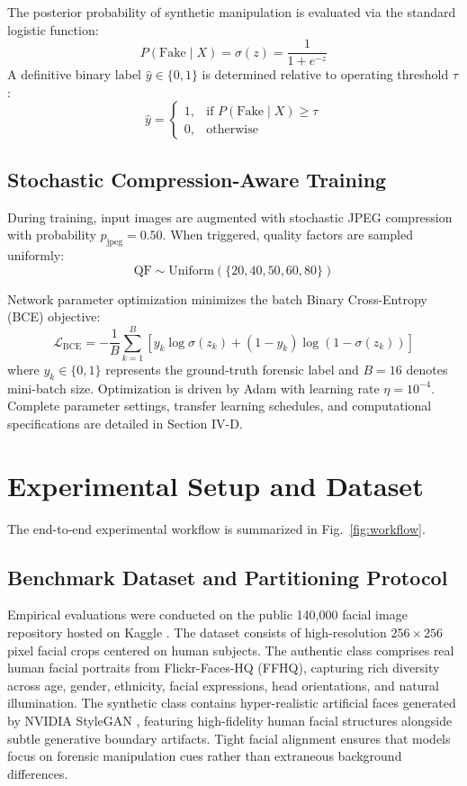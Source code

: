 \documentclass[conference]{IEEEtran}
\begin{document}
The posterior probability of synthetic manipulation is evaluated via the standard logistic function:
\begin{equation}
P(\text{Fake} \mid X) = \sigma(z) = \frac{1}{1 + e^{-z}}
\end{equation}
A definitive binary label $\hat{y} \in \{0, 1\}$ is determined relative to operating threshold $\tau$:
\begin{equation}
\hat{y} = \begin{cases} 1, & \text{if } P(\text{Fake} \mid X) \ge \tau \\ 0, & \text{otherwise} \end{cases}
\end{equation}

\subsection{Stochastic Compression-Aware Training}
During training, input images are augmented with stochastic JPEG compression with probability $p_{\text{jpeg}} = 0.50$. When triggered, quality factors are sampled uniformly:
\begin{equation}
\text{QF} \sim \text{Uniform}(\{20, 40, 50, 60, 80\})
\end{equation}

Network parameter optimization minimizes the batch Binary Cross-Entropy (BCE) objective:
\begin{equation}
\mathcal{L}_{\text{BCE}} = - \frac{1}{B} \sum_{k=1}^{B} \left[ y_k \log \sigma(z_k) + (1 - y_k) \log (1 - \sigma(z_k)) \right]
\end{equation}
where $y_k \in \{0, 1\}$ represents the ground-truth forensic label and $B = 16$ denotes mini-batch size. Optimization is driven by Adam with learning rate $\eta = 10^{-4}$. Complete parameter settings, transfer learning schedules, and computational specifications are detailed in Section IV-D.

\section{Experimental Setup and Dataset}

The end-to-end experimental workflow is summarized in Fig.~\ref{fig:workflow}.

\subsection{Benchmark Dataset and Partitioning Protocol}
Empirical evaluations were conducted on the public 140,000 facial image repository hosted on Kaggle \cite{kaggle140k}. The dataset consists of high-resolution $256 \times 256$ pixel facial crops centered on human subjects. The authentic class comprises real human facial portraits from Flickr-Faces-HQ (FFHQ), capturing rich diversity across age, gender, ethnicity, facial expressions, head orientations, and natural illumination. The synthetic class contains hyper-realistic artificial faces generated by NVIDIA StyleGAN \cite{karras2019style}, featuring high-fidelity human facial structures alongside subtle generative boundary artifacts. Tight facial alignment ensures that models focus on forensic manipulation cues rather than extraneous background differences.
\end{document}
